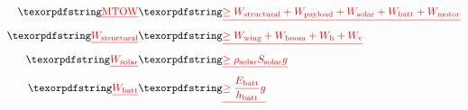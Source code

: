 
\begin{eqnarray*}
    \DIFdel{\label{e:weightsmtow}
    \text{MTOW} }&\DIFdel{\geq W_{\text{structural}} + W_{\text{payload}} + W_{\text{solar}} + W_{\text{batt}} + W_{\text{motor}} }\\
    \DIFdel{W_{\text{structural}} }&\DIFdel{\geq W_{\text{wing}} + W_{\text{boom}} + W_{\text{h}}+ W_{\text{v}} }\\
    \DIFdel{W_{\text{solar}} }&\DIFdel{\geq \rho_{\text{solar}} S_{\text{solar}} g }\\
    \DIFdel{W_{\text{batt}} }&\DIFdel{\geq \frac{E_{\text{batt}}}{h_{\text{batt}}} g
}\end{eqnarray*}

